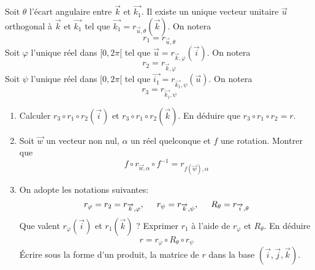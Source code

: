 Soit $\theta$ l'écart angulaire entre $\overrightarrow{k}$ et $\overrightarrow{k_1}$.
 Il existe un unique vecteur unitaire $\overrightarrow{u}$ orthogonal à $\overrightarrow{k}$ et $\overrightarrow{k_1}$ tel que $\overrightarrow{k_1}=r_{\overrightarrow{u},\theta}(\overrightarrow{k})$. On notera 
\begin{displaymath}
r_1=r_{\overrightarrow{u},\theta} 
\end{displaymath}
 Soit $\varphi$ l'unique réel dans $[0,2\pi[$ tel que $\overrightarrow{u} = r_{\overrightarrow{k},\varphi}(\overrightarrow{i})$. On notera
 \[r_2=r_{\overrightarrow{k},\varphi}\]
 Soit $\psi$ l'unique réel dans $[0,2\pi[$ tel que $\overrightarrow{i_1} = r_{\overrightarrow{k_1},\psi}(\overrightarrow{u})$. On notera
 \[r_3=r_{\overrightarrow{k_1},\psi}\]
 \begin{enumerate}
\item Calculer $r_3\circ r_1 \circ r_2 (\overrightarrow{i})$ et $r_3\circ r_1 \circ r_2 (\overrightarrow{k})$. En déduire que $r_3\circ r_1 \circ r_2=r$.
\item Soit $\overrightarrow{w}$ un vecteur non nul, $\alpha$ un réel quelconque et $f$ une rotation. Montrer que
\[f\circ r_{\overrightarrow{w},\alpha} \circ f^{-1}=r_{f(\overrightarrow{w}),\alpha}\]

\item On adopte les notations suivantes:
\begin{displaymath}
r_\varphi=r_2=r_{\overrightarrow{k},\varphi},\hspace{0.5cm} r_\psi=r_{\overrightarrow{k},\psi},\hspace{0.5cm} R_\theta=r_{\overrightarrow{i},\theta} 
\end{displaymath}
Que valent $r_\varphi(\overrightarrow{i})$ et $r_1(\overrightarrow{k})$ ? Exprimer $r_1$ à l'aide de $r_\varphi$ et $R_\theta$. En déduire
\[r=r_\varphi \circ R_\theta \circ r_\psi\] 
{\'E}crire sous la forme d'un produit, la matrice de $r$ dans la base $(\overrightarrow{i},\overrightarrow{j},\overrightarrow{k})$. 
\end{enumerate} 

